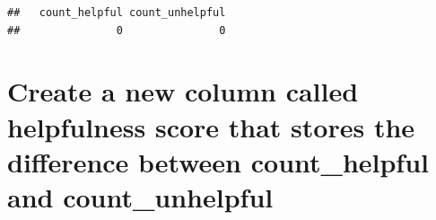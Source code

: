 \documentclass[
]{article}
\newenvironment{Shaded}{\begin{snugshade}}{\end{snugshade}}
\newcommand{\NormalTok}[1]{#1}
\newcommand{\OtherTok}[1]{\textcolor[rgb]{0.56,0.35,0.01}{#1}}
\newcommand{\SpecialCharTok}[1]{\textcolor[rgb]{0.81,0.36,0.00}{\textbf{#1}}}
\begin{document}
\begin{verbatim}
##   count_helpful count_unhelpful 
##               0               0
\end{verbatim}

\section{Create a new column called helpfulness score that stores the
difference between count\_helpful and
count\_unhelpful}\label{create-a-new-column-called-helpfulness-score-that-stores-the-difference-between-count_helpful-and-count_unhelpful}

\begin{Shaded}
\end{Shaded}
\end{document}
